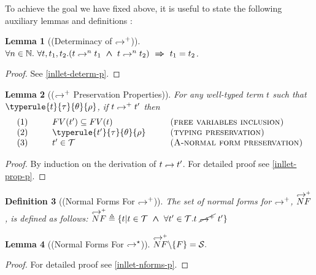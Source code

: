 \documentclass[a4paper,11pt,oneside]{article}
\theoremstyle{plain}
\newtheorem{definition}{Definition}[subsection]
\newtheorem{lemma}[definition]{Lemma}
\newcommand{\bwedge}{\boldsymbol{~\wedge~}}
\newcommand{\brarr}{\boldsymbol{~\Rightarrow~}}
\newcommand{\inlT}{\mathcal{T}}
\newcommand{\inlS}{\mathcal{S}}
\newcommand{\hookdownarrow}{\mathrel{\rotatebox[origin=c]{180}{$\hookleftarrow$}}}
\newcommand{\inlletarr}{\hookdownarrow}
\newcommand{\inlletplus}{\hookdownarrow^{+}}
\newcommand{\inlletNF}{\overset{\inlletplus}{NF}}
\newcommand{\inllet}[2]{#1 \hookdownarrow #2}
\newcommand{\inllett}[2]{#1 \inlletplus #2}
\begin{document}
To achieve the goal we have fixed above, it is useful to state the following auxiliary lemmas and definitions :

\begin{lemma}[(Determinacy of $\inlletplus$)] 
	$\forall n \in \mathbb{N}.~ \forall t, t_1, t_2.
		(t \inlletarr^{n} {t_1} \bwedge t \inlletarr^{n} {t_2}) \brarr
			t_1 = t_2$.	\label{inllet-determ-l}	
\end{lemma}
\begin{proof} See \ref{inllet-determ-p}. \end{proof}

\begin{lemma}[($\inlletplus$ Preservation Properties)]
For any well-typed term $t$ such that\\ $\typerule{t}{\tau}{\theta}{\rho}$, if $\inllett{t}{t'}$ then
\begin{displaymath}
\begin{array}{l@{\hspace*{1cm}}l@{\hspace*{1cm}}l}
	(1)& FV(t') \subseteq FV(t) & \textsc{(free variables inclusion)} \\
	(2)& \typerule{t'}{\tau}{\theta}{\rho} &\textsc{(typing preservation)} \\
	(3)& t' \in \inlT & \textsc{(A-normal form preservation)}
\end{array}
\end{displaymath}
 \label{inllet-prop-l}
\end{lemma}
\begin{proof}
 By induction on the derivation of $\inllet{t}{t'}$. For detailed proof see
 \ref{inllet-prop-p}.
 \end{proof}



\begin{definition}[(Normal Forms For $\inlletplus$)]
	The set of normal forms for $\inlletplus$,  $\inlletNF$, is defined as follows: \quad
 $ \inlletNF \triangleq \{ t | t \in \inlT \bwedge 
 \forall t' \in \inlT. t~\cancel{\inlletplus}~t' \} $
\end{definition}

\begin{lemma}[(Normal Forms For $\inlletarr^\star$)] 
$ \inlletNF \backslash \{ F \} = \inlS.$
\label{inllet-nforms-l}
\end{lemma}
\begin{proof}
For detailed proof see \ref{inllet-nforms-p}.
\end{proof}
\end{document}
